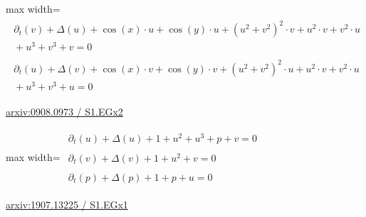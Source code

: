 \documentclass[10pt,a4paper]{article}
\begin{document}
\begin{minipage}{\linewidth}
\begin{center}\begin{adjustbox}{max width=\linewidth}$\displaystyle\begin{gathered}\begin{gathered}\partial_{t}(v)+\Delta(u)+\cos(x)\cdot u+\cos(y)\cdot u+(u^{2}+v^{2})^{2}\cdot v+u^{2}\cdot v+v^{2}\cdot u\\[-1pt]{}+u^{3}+v^{3}+v=0\end{gathered}\\[5pt]\begin{gathered}\partial_{t}(u)+\Delta(v)+\cos(x)\cdot v+\cos(y)\cdot v+(u^{2}+v^{2})^{2}\cdot u+u^{2}\cdot v+v^{2}\cdot u\\[-1pt]{}+u^{3}+v^{3}+u=0\end{gathered}\end{gathered}$\end{adjustbox}\end{center}
{\small \href{https://arxiv.org/html/0908.0973#S1.EGx2}{arxiv:0908.0973 / S1.EGx2}}\par
\end{minipage}\par\vspace{7mm}

\begin{minipage}{\linewidth}
\begin{center}\begin{adjustbox}{max width=\linewidth}$\displaystyle\begin{gathered}\begin{gathered}\partial_{t}(u)+\Delta(u)+1+u^{2}+u^{3}+p+v=0\end{gathered}\\[5pt]\begin{gathered}\partial_{t}(v)+\Delta(v)+1+u^{2}+v=0\end{gathered}\\[5pt]\begin{gathered}\partial_{t}(p)+\Delta(p)+1+p+u=0\end{gathered}\end{gathered}$\end{adjustbox}\end{center}
{\small \href{https://arxiv.org/html/1907.13225#S1.EGx1}{arxiv:1907.13225 / S1.EGx1}}\par
\end{minipage}\par\vspace{7mm}
\end{document}
